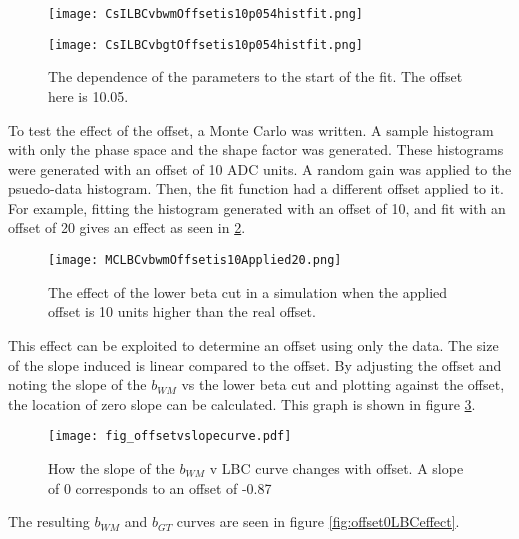 \documentclass[../MaxHughesThesis.tex]{subfiles}
\begin{document}
\begin{figure}
    \centering
    \begin{minipage}{0.50\textwidth}
        \centerline{\texttt{[image: CsILBCvbwmOffsetis10p054histfit.png]}}
    \end{minipage}\hfill
    \begin{minipage}{0.50\textwidth}
        \centerline{\texttt{[image: CsILBCvbgtOffsetis10p054histfit.png]}}
    \end{minipage}
    \caption{The dependence of the parameters to the start of the fit.
	     The offset here is 10.05.}
    \label{fig:offset10LBCeffect}
\end{figure}

To test the effect of the offset, a Monte Carlo was written.
A sample histogram with only the phase space and the shape factor was generated. 
These histograms were generated with an offset of 10 ADC units.
A random gain was applied to the psuedo-data histogram. 
Then, the fit function had a different offset applied to it.
For example, fitting the histogram generated with an offset of 10, and fit with an offset of 20 gives an effect as seen in \ref{fig:MCoffset10applied20}.

\begin{figure}
	\centerline{\texttt{[image: MCLBCvbwmOffsetis10Applied20.png]}}
	\caption{The effect of the lower beta cut in a simulation when the applied offset is 10 units higher than the real offset.}
	\label{fig:MCoffset10applied20}
\end{figure}

This effect can be exploited to determine an offset using only the data. 
The size of the slope induced is linear compared to the offset. %
By adjusting the offset and noting the slope of the $b_{WM}$ vs the lower beta cut and plotting against the offset, the location of zero slope can be calculated.
This graph is shown in figure \ref{fig:slopevoffset}.
\begin{figure}[!htb]
	\centerline{\texttt{[image: fig\_offsetvslopecurve.pdf]}}
	\caption{How the slope of the $b_{WM}$ v LBC curve changes with offset.
		 A slope of 0 corresponds to an offset of -0.87}
	\label{fig:slopevoffset}
\end{figure}
The resulting $b_{WM}$ and $b_{GT}$ curves are seen in figure \ref{fig:offset0LBCeffect}.
\end{document}
